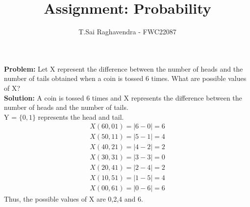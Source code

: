 \documentclass{article}
\newcommand{\Problem}{\noindent \textbf{Problem: }}
\newcommand{\solution}{\noindent \textbf{Solution: }}
\begin{document}
\title{Assignment: Probability}
\author{\Large T.Sai Raghavendra - FWC22087}
\date{}


\maketitle

\Problem Let X represent the difference between the number of heads and the number of tails obtained when a coin is tossed 6 times. What are possible values of X?\\

\solution
A coin is tossed 6 times and X represents the difference between the number of heads and the number of tails.\\
Y = $\{0,1\}$ represents the head and tail.
\begin{align}
X(60,01) = |6-0| = 6\\
X(50,11) = |5-1| = 4\\
X(40,21) = |4-2| = 2\\
X(30,31) = |3-3| = 0\\
X(20,41) = |2-4| = 2\\
X(10,51) = |1-5| = 4\\
X(00,61) = |0-6| = 6
\end{align}
Thus, the possible values of X are 0,2,4 and 6.
\end{document}
